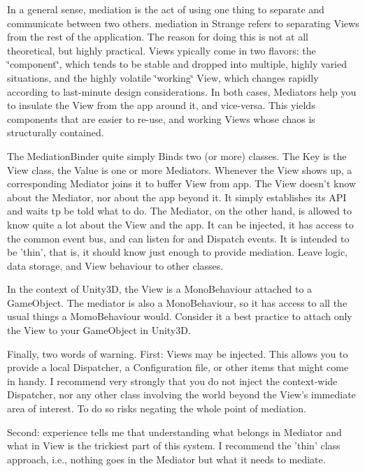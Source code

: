 In a general sense, mediation is the act of using one thing to separate and communicate between two others. mediation in Strange refers to separating Views from the rest of the application. The reason for doing this is not at all theoretical, but highly practical. Views ypically come in two flavors\-: the \char`\"{}component\char`\"{}, which tends to be stable and dropped into multiple, highly varied situations, and the highly volatile \char`\"{}working\char`\"{} View, which changes rapidly according to last-\/minute design considerations. In both cases, Mediators help you to insulate the View from the app around it, and vice-\/versa. This yields components that are easier to re-\/use, and working Views whose chaos is structurally contained.

The Mediation\-Binder quite simply Binds two (or more) classes. The Key is the View class, the Value is one or more Mediators. Whenever the View shows up, a corresponding Mediator joins it to buffer View from app. The View doesn't know about the Mediator, nor about the app beyond it. It simply establishes its A\-P\-I and waits tp be told what to do. The Mediator, on the other hand, is allowed to know quite a lot about the View and the app. It can be injected, it has access to the common event bus, and can listen for and Dispatch events. It is intended to be 'thin', that is, it should know just enough to provide mediation. Leave logic, data storage, and View behaviour to other classes.

In the context of Unity3\-D, the View is a Mono\-Behaviour attached to a Game\-Object. The mediator is also a Mono\-Behaviour, so it has access to all the usual things a Momo\-Behaviour would. Consider it a best practice to attach only the View to your Game\-Object in Unity3\-D.

Finally, two words of warning. First\-: Views may be injected. This allows you to provide a local Dispatcher, a Configuration file, or other items that might come in handy. I recommend very strongly that you do not inject the context-\/wide Dispatcher, nor any other class involving the world beyond the View's immediate area of interest. To do so risks negating the whole point of mediation.

Second\-: experience tells me that understanding what belongs in Mediator and what in View is the trickiest part of this system. I recommend the 'thin' class approach, i.\-e., nothing goes in the Mediator but what it needs to mediate. 

